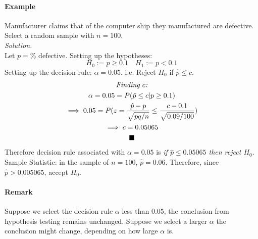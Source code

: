 \documentclass{article}
\begin{document}
			\paragraph{Example} Manufacturer claims that  of the computer ship they manufactured are defective. Select a random sample with $n=100$.
			\\
			\emph{Solution.}
			\\
			Let $p=\%$ defective. Setting up the hypotheses:
				\[
					H_0 := p \geq 0.1 \quad
					H_1 := p < 0.1
				\]
			Setting up the decision rule: $\alpha = 0.05$. i.e. Reject $H_0$ if $\hat{p} \leq c$.
			\begin{multline*}
				\emph{Finding $c$:} \\
				\alpha = 0.05 = P(\hat{p} \leq c | p \geq 0.1) \\
				\implies 0.05 = P(z=\frac{\hat{p}-p}{\sqrt{pq/n}} \leq \frac{c-0.1}{\sqrt{0.09/100}}) \\
				\implies c = 0.05065 \\
				\blacksquare
			\end{multline*}
			Therefore decision rule associated with $\alpha = 0.05$ is \emph{if $\hat{p} \leq 0.05065$ then reject $H_0$.}
			\\
			Sample Statistic: in the sample of $n=100$, $\hat{p} = 0.06$. Therefore, since $\hat{p} > 0.005065$, accept $H_0$.
			
			\paragraph{Remark} Suppose we select the decision rule $\alpha$ less than $0.05$, the conclusion from hypothesis testing remains unchanged. Suppose we select a larger $\alpha$ the conclusion might change, depending on how large $\alpha$ is.
\end{document}
